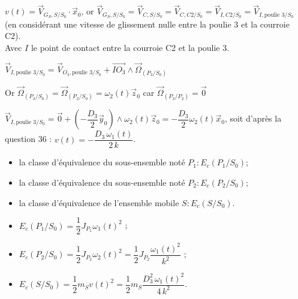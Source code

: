 \ifprof
\begin{corrige}
$v(t) = \overrightarrow{V}_{G_S, S/S_0} \cdot \vec x_0$, or $\overrightarrow{V}_{G_S, S/S_0} = \overrightarrow{V}_{C, S/S_0} = \overrightarrow{V}_{C, C2/S_0} = \overrightarrow{V}_{I, C2/S_0} = \overrightarrow{V}_{I, \text{poulie } 3/S_0}$ (en considérant une vitesse de glissement nulle entre la poulie $3$ et la courroie C2).\\

Avec $I$ le point de contact entre la courroie C2 et la poulie $3$.

$\overrightarrow{V}_{I, \text{poulie } 3 /S_0} = \overrightarrow{V}_{O_3, \text{poulie } 3/S_0} + \overrightarrow{IO_3} \wedge \overrightarrow{\Omega}_{(P_3/S_0)}$

Or $\overrightarrow{\Omega}_{(P_3/S_0)} = \overrightarrow{\Omega}_{(P_2/S_0)} = \omega_2(t) \vec z_0$ \qquad car $\overrightarrow{\Omega}_{(P_3/P_2)} = \overrightarrow 0$

$\overrightarrow{V}_{I, \text{poulie } 3 /S_0} = \overrightarrow 0 + (-\dfrac{D_3}{2} \vec y_0) \wedge \omega_2(t) \vec z_0 = -\dfrac{D_3}{2} \omega_2(t) \vec x_0$, soit d'après la question 36 :
$ v(t) = - \dfrac{D_3 \, \omega_1(t)}{2 \, k}$.
\end{corrige}
\else
\fi




\begin{itemize}
  \item la classe d'équivalence du sous-ensemble noté $P_{1}: E_{c}\left(P_{1} / S_{0}\right)$;
  \item la classe d'équivalence du sous-ensemble noté $P_{2}: E_{c}\left(P_{2} / S_{0}\right)$;
  \item la classe d'équivalence de l'ensemble mobile $S: E_{c}\left(S / S_{0}\right)$.
\end{itemize}

\ifprof
\begin{corrige}
\begin{itemize}
\item $E_c(P_1/S_0) = \dfrac{1}{2} J_{P_1} \omega_1(t)^2$ ;
\item $E_c(P_2/S_0) = \dfrac{1}{2} J_{P_2} \omega_2(t)^2 = \dfrac{1}{2} J_{P_2} \dfrac{\omega_1(t)^2}{k^2} $ ;
\item $E_c(S/S_0) = \dfrac{1}{2} m_S v(t)^2 = \dfrac{1}{2} m_S  \dfrac{D_3^2 \, \omega_1(t)^2}{4 \, k^2}$.
\end{itemize}
\end{corrige}
\else
\fi

